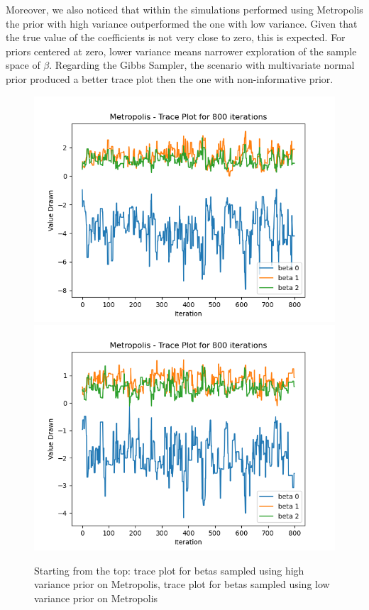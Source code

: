 \documentclass{article}
\begin{document}
Moreover, we also noticed that within the simulations performed using Metropolis the prior with high variance outperformed the one with low variance. Given that the true value of the coefficients is not very close to zero, this is expected. For priors centered at zero, lower variance means narrower exploration of the sample space of \(\beta\). Regarding the Gibbs Sampler, the scenario with multivariate normal prior produced a better trace plot then the one with non-informative prior. 
\begin{figure}[htp]
    \centering
    \includegraphics[scale=0.6]{images/trace_metropolis_highvar_800_warmup_0.png}
    \includegraphics[scale=0.6]{images/trace_metropolis_lowvar_800_warmup_0.png}
    \caption{Starting from the top: trace plot for betas sampled using high variance prior on Metropolis, trace plot for betas sampled using low variance prior on Metropolis}
    \label{fig:trace_2}
\end{figure}
\end{document}
